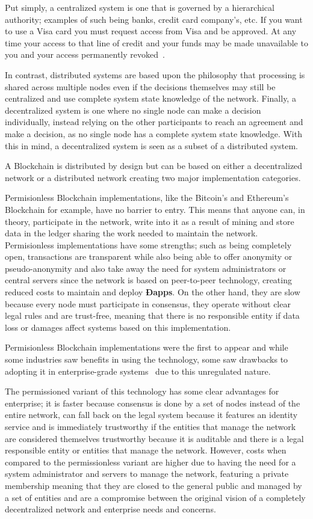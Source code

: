 Put simply, a centralized system is one that is governed by a hierarchical
authority; examples of such being banks, credit card company’s, etc. If you
want to use a Visa card you must request access from Visa and be approved. At
any time your access to that line of credit and your funds may be made
unavailable to you and your access permanently revoked~\cite{Dreifuerst2018}.

In contrast, distributed systems are based upon the philosophy that processing
is shared across multiple nodes even if the decisions themselves may still be
centralized and use complete system state knowledge of the network. Finally, a
decentralized system is one where no single node can make a decision
individually, instead relying on the other participants to reach an agreement
and make a decision, as no single node has a complete system state knowledge.
With this in mind, a decentralized system is seen as a subset of a distributed
system.

A Blockchain is distributed by design but can be based on either a
decentralized network or a distributed network creating two major
implementation categories.

Permisionless Blockchain implementations, like the Bitcoin's and Ethereum's
Blockchain for example, have no barrier to entry. This means that anyone can,
in theory, participate in the network, write into it as a result of mining and
store data in the ledger sharing the work needed to maintain the network.
Permisionless implementations have some strengths; such as being completely
open, transactions are transparent while also being able to offer anonymity or
pseudo-anonymity and also take away the need for system administrators or
central servers since the network is based on peer-to-peer technology, creating
reduced costs to maintain and deploy \textbf{Ðapps}. On the other hand, they
are slow because every node must participate in consensus, they operate without
clear legal rules and are trust-free, meaning that there is no responsible entity
if data loss or damages affect systems based on this implementation.

Permisionless Blockchain implementations were the first to appear and while
some industries saw benefits in using the technology, some saw drawbacks to
adopting it in enterprise-grade systems~\cite{Gopinath2016} due to this
unregulated nature.

The permissioned variant of this technology has some clear advantages for
enterprise; it is faster because consensus is done by a set of nodes instead of
the entire network, can fall back on the legal system because it features an
identity service and is immediately trustworthy if the entities that manage the
network are considered themselves trustworthy because it is auditable and there
is a legal responsible entity or entities that manage the network. However,
costs when compared to the permissionless variant are higher due to having the
need for a system administrator and servers to manage the network, featuring a
private membership meaning that they are closed to the general public and
managed by a set of entities and are a compromise between the original vision
of a completely decentralized network and enterprise needs and concerns. 

